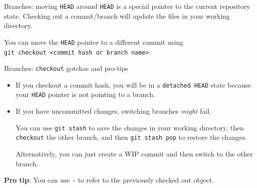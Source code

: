 \documentclass{beeper}
\begin{document}
\begin{frame}{Branches: moving \texttt{HEAD} around}
    \texttt{HEAD} is a special pointer to the current repository state.
    Checking out a commit/branch will update the files in your working
    directory.

    You can move the \texttt{HEAD} pointer to a different commit using\\
    \texttt{git checkout <commit hash or branch name>}.


\end{frame}

\begin{frame}{Branches: \texttt{checkout} gotchas and pro-tips}
    \begin{itemize}
        \item If you checkout a commit hash, you will be in a \texttt{detached
            HEAD} state because your \texttt{HEAD} pointer is not pointing to a
            branch.
            \pause

        \item If you have uncommitted changes, switching branches \textit{might}
            fail.
            \pause

            You can use \texttt{git stash} to save the changes in your working
            directory, then \texttt{checkout} the other branch, and then
            \texttt{git stash pop} to restore the changes.

            Alternatively, you can just create a WIP commit and then switch to
            the other branch.
    \end{itemize}
    \pause

    \textbf{Pro tip}: You can use \texttt{-} to refer to the previously checked
    out object.
\end{frame}
\end{document}
